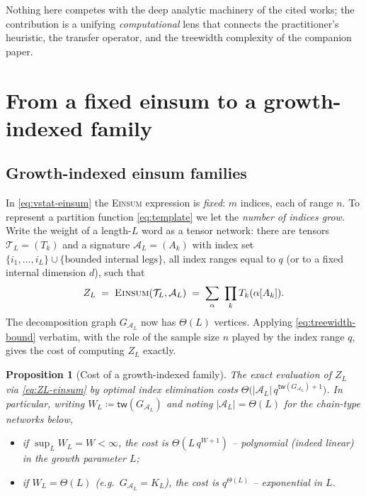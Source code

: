 \documentclass[11pt]{article}
\newcommand{\Einsum}{\textsc{Einsum}}
\newcommand{\calA}{\mathcal{A}}
\newcommand{\calT}{\mathcal{T}}
\newcommand{\tw}{\mathsf{tw}}
\newcommand{\treewidthp}[1]{\tw(#1)}
\newcommand{\graphform}[1]{G_{#1}}
\newcommand{\eqdef}{\coloneqq}
\theoremstyle{plain}
\newtheorem{proposition}[theorem]{Proposition}
\theoremstyle{definition}
\theoremstyle{remark}
\begin{document}
Nothing here competes with the deep analytic machinery of the cited works; the
contribution is a unifying \emph{computational} lens that connects the
practitioner's heuristic, the transfer operator, and the treewidth complexity of
the companion paper.

\section{From a fixed einsum to a growth-indexed family}
\label{sec:dictionary}

\subsection{Growth-indexed einsum families}

In \eqref{eq:vstat-einsum} the \Einsum{} expression is \emph{fixed}: $m$ indices,
each of range $n$. To represent a partition function \eqref{eq:template} we let the
\emph{number of indices grow}. Write the weight of a length-$L$ word as a tensor
network: there are tensors $\calT_L=(T_k)$ and a signature
$\calA_L=(A_k)$ with index set $\{i_1,\dots,i_L\}\cup\{\text{bounded internal
legs}\}$, all index ranges equal to $q$ (or to a fixed internal dimension $d$),
such that
\begin{equation}
\label{eq:ZL-einsum}
   Z_L\;=\;\Einsum(\calT_L,\calA_L)\;=\;\sum_{\alpha}\ \prod_k T_k(\alpha[A_k]).
\end{equation}
The decomposition graph $\graphform{\calA_L}$ now has $\Theta(L)$ vertices.
Applying \eqref{eq:treewidth-bound} verbatim, with the role of the sample size $n$
played by the index range $q$, gives the cost of computing $Z_L$ exactly.

\begin{proposition}[Cost of a growth-indexed family]
\label{prop:cost}
The exact evaluation of $Z_L$ via \eqref{eq:ZL-einsum} by optimal index
elimination costs
$\Theta\!\bigl(|\calA_L|\,q^{\treewidthp{\graphform{\calA_L}}+1}\bigr)$.
In particular, writing $W_L\eqdef\treewidthp{\graphform{\calA_L}}$ and noting
$|\calA_L|=\Theta(L)$ for the chain-type networks below,
\begin{itemize}[leftmargin=1.6em,itemsep=1pt]
\item if $\sup_L W_L=W<\infty$, the cost is $\Theta(L\,q^{W+1})$ -- \emph{polynomial
(indeed linear) in the growth parameter $L$};
\item if $W_L=\Theta(L)$ (e.g.\ $\graphform{\calA_L}=K_L$), the cost is
$q^{\Theta(L)}$ -- \emph{exponential in $L$}.
\end{itemize}
\end{proposition}
\end{document}
